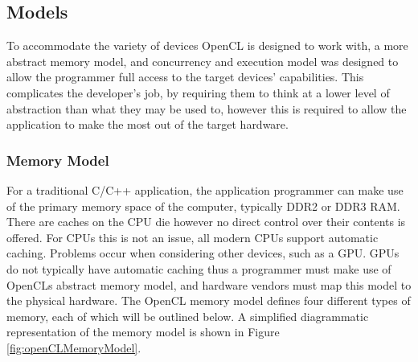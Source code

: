 \subsection{Models}

To accommodate the variety of devices OpenCL is designed to work with, a more
abstract memory model, and concurrency and execution model was designed to allow
the programmer full access to the target devices' capabilities. This complicates
the developer's job, by requiring them to think at a lower level of abstraction
than what they may be used to, however this is required to allow the application
to make the most out of the target hardware.

\subsubsection{Memory Model}

For a traditional C/C++ application, the application programmer can make use of
the primary memory space of the computer, typically DDR2 or DDR3 RAM. There are
caches on the CPU die however no direct control over their contents is offered.
For CPUs this is not an issue, all modern CPUs support automatic caching.
Problems occur when considering other devices, such as a GPU. GPUs do not
typically have automatic caching thus a programmer must make use of OpenCLs
abstract memory model, and hardware vendors must map this model to the physical
hardware. The OpenCL memory model defines four different types of memory, each
of which will be outlined below. A simplified diagrammatic representation of the
memory model is shown in Figure \ref{fig:openCLMemoryModel}.

